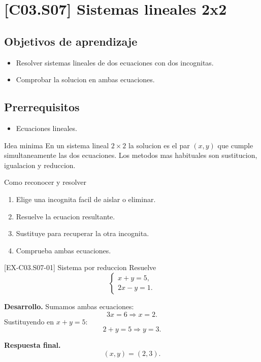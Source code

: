 \section{[C03.S07] Sistemas lineales 2x2}

\subsection*{Objetivos de aprendizaje}
\begin{itemize}
  \item Resolver sistemas lineales de dos ecuaciones con dos incognitas.
  \item Comprobar la solucion en ambas ecuaciones.
\end{itemize}

\subsection*{Prerrequisitos}
\begin{itemize}
  \item Ecuaciones lineales.
\end{itemize}

\begin{theorybox}{Idea minima}
En un sistema lineal \(2\times 2\) la solucion es el par \((x,y)\) que cumple simultaneamente
las dos ecuaciones. Los metodos mas habituales son sustitucion, igualacion y reduccion.
\end{theorybox}

\begin{methodbox}{Como reconocer y resolver}
\begin{enumerate}
  \item Elige una incognita facil de aislar o eliminar.
  \item Resuelve la ecuacion resultante.
  \item Sustituye para recuperar la otra incognita.
  \item Comprueba ambas ecuaciones.
\end{enumerate}
\end{methodbox}

\begin{solvedexample}{[EX-C03.S07-01] Sistema por reduccion}
Resuelve
\[
\begin{cases}
x+y=5,\\
2x-y=1.
\end{cases}
\]

\textbf{Desarrollo.} Sumamos ambas ecuaciones:
\[
3x=6 \Longrightarrow x=2.
\]
Sustituyendo en \(x+y=5\):
\[
2+y=5 \Longrightarrow y=3.
\]

\textbf{Respuesta final.}
\[
(x,y)=(2,3).
\]
\end{solvedexample}

